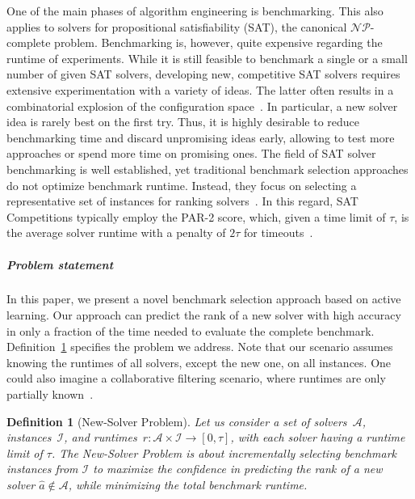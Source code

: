 \documentclass[sn-basic, Numbered]{sn-jnl} %
\newtheorem{definition}{Definition} %
\begin{document}
One of the main phases of algorithm engineering is benchmarking.
This also applies to solvers for propositional satisfiability (SAT), the canonical $\mathcal{NP}$-complete problem.
Benchmarking is, however, quite expensive regarding the runtime of experiments.
While it is still feasible to benchmark a single or a small number of given SAT solvers, developing new, competitive SAT solvers requires extensive experimentation with a variety of ideas.
The latter often results in a combinatorial explosion of the configuration space~\cite{HutterHL11}.
In particular, a new solver idea is rarely best on the first try.
Thus, it is highly desirable to reduce benchmarking time and discard unpromising ideas early, allowing to test more approaches or spend more time on promising ones.
The field of SAT solver benchmarking is well established, yet traditional benchmark selection approaches do not optimize benchmark runtime.
Instead, they focus on selecting a representative set of instances for ranking solvers~\cite{Gelder11,HoosKSS13}.
In this regard, SAT Competitions typically employ the \mbox{PAR-2} score, which, given a time limit of $\tau$, is the average solver runtime with a penalty of $2 \tau$ for timeouts~\cite{FroleyksHIJS21}.

\subparagraph{Problem statement}

In this paper, we present a novel benchmark selection approach based on active learning.
Our approach can predict the rank of a new solver with high accuracy in only a fraction of the time needed to evaluate the complete benchmark.
Definition~\ref{def:new-solver-problem} specifies the problem we address.
Note that our scenario assumes knowing the runtimes of all solvers, except the new one, on all instances.
One could also imagine a collaborative filtering scenario, where runtimes are only partially known~\cite{misir2017data,misir2017alors}.

\begin{definition}[New-Solver Problem]
  Let us consider a set of solvers~$\mathcal{A}$, instances~$\mathcal{I}$, and runtimes~${r\!: \mathcal{A} \times \mathcal{I} \rightarrow \left[0, \tau\right]}$, with each solver having a runtime limit of $\tau$.
  The \emph{New-Solver Problem} is about incrementally selecting benchmark instances from $\mathcal{I}$ to maximize the confidence in predicting the rank of a new solver $\hat{a} \notin \mathcal{A}$, while minimizing the total benchmark runtime.
  \label{def:new-solver-problem}
\end{definition}
\end{document}

